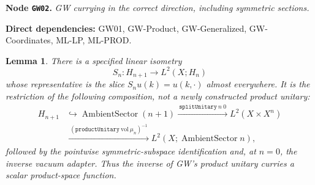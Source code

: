 \documentclass[11pt,a4paper]{article}
\newtheorem{lemma}[theorem]{Lemma}
\theoremstyle{remark}\newtheorem{remark}[theorem]{Remark}
\newcommand{\node}[3]{\par\Needspace{6\baselineskip}\smallskip\hypertarget{node:#1}{}\label{nodepage:#1}\noindent\textbf{Node \texttt{#1}.} \textit{#2.}\par\noindent\textbf{Direct dependencies:} #3.\par}
\begin{document}
\node{GW02}{GW currying in the correct direction, including symmetric sections}{GW01, GW-Product, GW-Generalized, GW-Coordinates, ML-LP, ML-PROD}
\begin{lemma}\label{lem:gwcurrying}
There is a specified linear isometry
\[
 S_n:H_{n+1}\longrightarrow L^2(X;H_n)
\]
whose representative is the slice $S_nu(k)=u(k,\cdot)$ almost everywhere. It is the restriction of the following composition, not a newly constructed product unitary:
\begin{align*}
 H_{n+1}&\hookrightarrow\operatorname{AmbientSector}(n+1)
 \xrightarrow{\ \texttt{splitUnitary}\ n\ 0\ }L^2(X\times X^n)\\
 &\xrightarrow{\ (\texttt{productUnitary}\ \mathrm{vol}\ \mu_n)^{-1}\ }
 L^2(X;\operatorname{AmbientSector}n),
\end{align*}
followed by the pointwise symmetric-subspace identification and, at $n=0$, the inverse vacuum adapter. Thus \emph{the inverse} of GW's product unitary curries a scalar product-space function.
\end{lemma}
\end{document}
